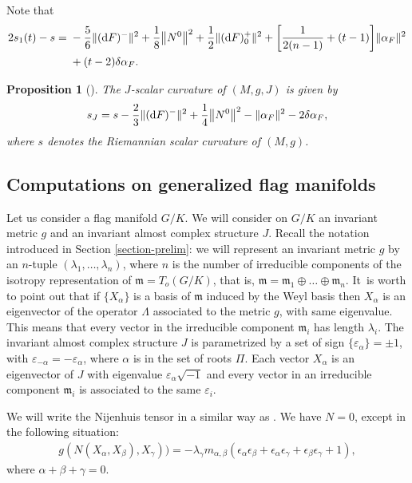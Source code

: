 \documentclass[10pt,a4paper]{amsart}
\numberwithin{equation}{section}
\newtheorem{Proposition}[Theorem]{Proposition}
 { \theoremstyle{definition}
\newtheorem{Definition}[Theorem]{Definition}
\newtheorem{Question}[Theorem]{Question}
\newtheorem*{Notation}{Notation}
\newtheorem{Example}[Theorem]{Example}
\newtheorem{Remark}[Theorem]{Remark} }
\begin{document}
Note that\vspace{-1ex}
\begin{align*}
2s_{1}(t)-s={}&-\dfrac{5}{6}\|({\rm d}F)^{-}\|^{2}+\dfrac{1}{8}\big\|N^{0}\big\|^{2}+\dfrac{1}{2}\|({\rm d}F)_{0}^{+}\|^{2}+\bigg[\dfrac{1}{2(n-1)}+(t-1)\bigg]\|\alpha_{F}\|^{2}
\\
&+(t-2)\delta\alpha_{F}.
\end{align*}

\begin{Proposition}[\cite{fu}]
The $J$-scalar curvature of $(M,g,J)$ is given by\vspace{-1ex}
\begin{gather*}
s_{J}=s-\dfrac{2}{3}\|({\rm d}F)^{-}\|^{2}+\dfrac{1}{4}\big\|N^{0}\big\|^{2}-\|\alpha_{F}\|^{2}-2\delta\alpha_{F},
\end{gather*}
where $s$ denotes the Riemannian scalar curvature of $(M,g)$.
\end{Proposition}

\subsection{Computations on generalized flag manifolds} \label{sec-computations}
Let us consider a flag manifold $G/K$. We will consider on $G/K$ an invariant metric $g$ and an invariant almost complex structure $J$. Recall the notation introduced in Section \ref{section-prelim}: we will represent an invariant metric $g$ by an $n$-tuple $(\lambda_1,\ldots, \lambda_n)$, where $n$ is the number of irreducible components of the isotropy representation of $\mathfrak{m}=T_o(G/K)$, that is, $\mathfrak{m}=\mathfrak{m}_1\oplus \dots \oplus \mathfrak{m}_n$. It~is worth to point out that if $\{ X_\alpha \}$ is a basis of $\mathfrak{m}$ induced by the Weyl basis then $X_\alpha$ is an eigenvector of the operator $\Lambda$ associated to the metric $g$, with same eigenvalue. This means that every vector in the irreducible component $\mathfrak{m}_i$ has length $\lambda_i$. The invariant almost complex structure $J$ is parametrized by a set of sign $\{ \varepsilon_\alpha \} =\pm 1 $, with $\varepsilon_{-\alpha}=-\varepsilon_\alpha$, where $\alpha$ is in the set of roots $\Pi$. Each vector $X_\alpha$ is an eigenvector of $J$ with eigenvalue $\varepsilon_\alpha\sqrt{-1}$ and every vector in an irreducible component $\mathfrak{m}_i$ is associated to the same $\varepsilon_i$.

We will write the Nijenhuis tensor in a similar way as \cite{sn}. We have $N=0$, except in the following situation:
\begin{gather*}
g(N(X_{\alpha},X_{\beta}),X_{\gamma}))=-\lambda_{\gamma}m_{\alpha,\beta}(\epsilon_{\alpha}\epsilon_{\beta}
+\epsilon_{\alpha}\epsilon_{\gamma}+\epsilon_{\beta}\epsilon_{\gamma}+1),
\end{gather*}
where $\alpha+\beta+\gamma=0$.
\end{document}
